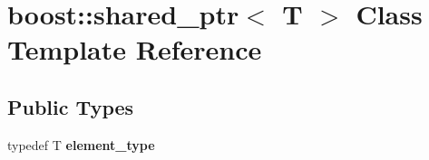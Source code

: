 \hypertarget{classboost_1_1shared__ptr}{\section{boost\+:\+:shared\+\_\+ptr$<$ T $>$ Class Template Reference}
\label{classboost_1_1shared__ptr}
}
\subsection*{Public Types}
\begin{DoxyCompactItemize}
\item 
\hypertarget{classboost_1_1shared__ptr_ab268a0e0bb107869852ebda109afa85b}{typedef T {\bfseries element\+\_\+type}}\label{classboost_1_1shared__ptr_ab268a0e0bb107869852ebda109afa85b}

\end{DoxyCompactItemize}
